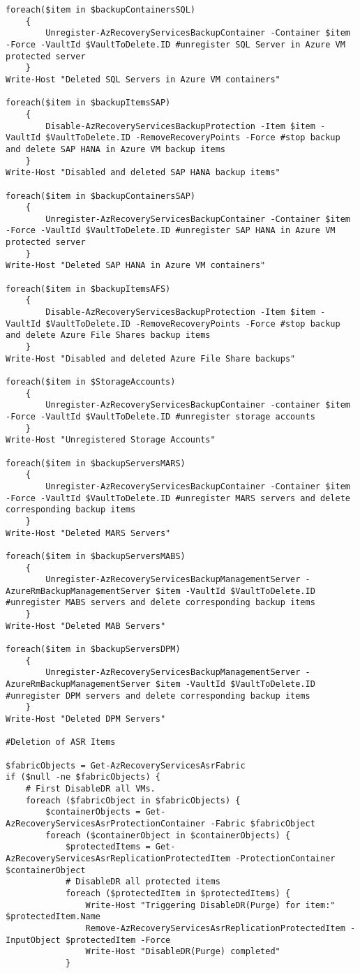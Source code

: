 \begin{verbatim}
foreach($item in $backupContainersSQL)
    {
        Unregister-AzRecoveryServicesBackupContainer -Container $item -Force -VaultId $VaultToDelete.ID #unregister SQL Server in Azure VM protected server
    }
Write-Host "Deleted SQL Servers in Azure VM containers"

foreach($item in $backupItemsSAP)
    {
        Disable-AzRecoveryServicesBackupProtection -Item $item -VaultId $VaultToDelete.ID -RemoveRecoveryPoints -Force #stop backup and delete SAP HANA in Azure VM backup items
    }
Write-Host "Disabled and deleted SAP HANA backup items"

foreach($item in $backupContainersSAP)
    {
        Unregister-AzRecoveryServicesBackupContainer -Container $item -Force -VaultId $VaultToDelete.ID #unregister SAP HANA in Azure VM protected server
    }
Write-Host "Deleted SAP HANA in Azure VM containers"

foreach($item in $backupItemsAFS)
    {
        Disable-AzRecoveryServicesBackupProtection -Item $item -VaultId $VaultToDelete.ID -RemoveRecoveryPoints -Force #stop backup and delete Azure File Shares backup items
    }
Write-Host "Disabled and deleted Azure File Share backups"

foreach($item in $StorageAccounts)
    {
        Unregister-AzRecoveryServicesBackupContainer -container $item -Force -VaultId $VaultToDelete.ID #unregister storage accounts
    }
Write-Host "Unregistered Storage Accounts"

foreach($item in $backupServersMARS)
    {
    	Unregister-AzRecoveryServicesBackupContainer -Container $item -Force -VaultId $VaultToDelete.ID #unregister MARS servers and delete corresponding backup items
    }
Write-Host "Deleted MARS Servers"

foreach($item in $backupServersMABS)
    {
	    Unregister-AzRecoveryServicesBackupManagementServer -AzureRmBackupManagementServer $item -VaultId $VaultToDelete.ID #unregister MABS servers and delete corresponding backup items
    }
Write-Host "Deleted MAB Servers"

foreach($item in $backupServersDPM)
    {
	    Unregister-AzRecoveryServicesBackupManagementServer -AzureRmBackupManagementServer $item -VaultId $VaultToDelete.ID #unregister DPM servers and delete corresponding backup items
    }
Write-Host "Deleted DPM Servers"

#Deletion of ASR Items

$fabricObjects = Get-AzRecoveryServicesAsrFabric
if ($null -ne $fabricObjects) {
	# First DisableDR all VMs.
	foreach ($fabricObject in $fabricObjects) {
		$containerObjects = Get-AzRecoveryServicesAsrProtectionContainer -Fabric $fabricObject
		foreach ($containerObject in $containerObjects) {
			$protectedItems = Get-AzRecoveryServicesAsrReplicationProtectedItem -ProtectionContainer $containerObject
			# DisableDR all protected items
			foreach ($protectedItem in $protectedItems) {
				Write-Host "Triggering DisableDR(Purge) for item:" $protectedItem.Name
				Remove-AzRecoveryServicesAsrReplicationProtectedItem -InputObject $protectedItem -Force
				Write-Host "DisableDR(Purge) completed"
			}


\end{verbatim}
